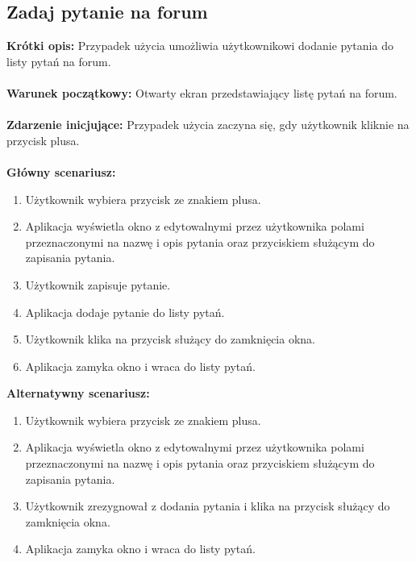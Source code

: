 \documentclass[10pt,a4paper]{report}
\begin{document}
\begin{adjustwidth}{2cm}{2cm}
\subsection{Zadaj pytanie na forum}
\begin{minipage}{1\linewidth}
\textbf{Krótki opis:} Przypadek użycia umożliwia użytkownikowi dodanie pytania do listy pytań na forum.   \\ \\
\textbf{Warunek początkowy:} Otwarty ekran przedstawiający listę pytań na forum.  \\ \\
\textbf{Zdarzenie inicjujące:} Przypadek użycia zaczyna się, gdy użytkownik kliknie na przycisk plusa. \\ \\ 
\textbf{Główny scenariusz:} 
\begin{enumerate}
\setlength\itemsep{0.2cm}
    \item Użytkownik wybiera przycisk ze znakiem plusa. 
    \item Aplikacja wyświetla okno z edytowalnymi przez użytkownika polami przeznaczonymi na nazwę i opis pytania oraz przyciskiem służącym do zapisania pytania.
    \item Użytkownik zapisuje pytanie.
    \item Aplikacja dodaje pytanie do listy pytań.
    \item Użytkownik klika na przycisk służący do zamknięcia okna.
    \item Aplikacja zamyka okno i wraca do listy pytań. \\
\end{enumerate}
\textbf{Alternatywny scenariusz:} 
\begin{enumerate}
\setlength\itemsep{0.2cm}
    \item Użytkownik wybiera przycisk ze znakiem plusa.
    \item Aplikacja wyświetla okno z edytowalnymi przez użytkownika polami przeznaczonymi na nazwę i opis pytania oraz przyciskiem służącym do zapisania pytania.
    \item Użytkownik zrezygnował z dodania pytania i klika na  przycisk służący do zamknięcia okna.
    \item Aplikacja zamyka okno i wraca do listy pytań.
\end{enumerate}
\end{minipage}

\end{adjustwidth}
\end{document}
